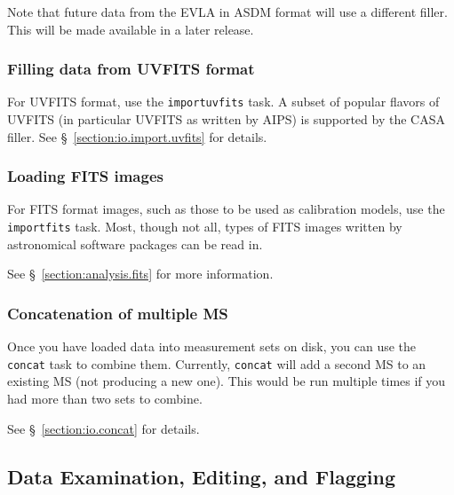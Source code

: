 
Note that future data from the EVLA in ASDM format will use a
different filler.  This will be made available in a later release.

\subsubsection{Filling data from UVFITS format}
\label{section:intro.walkthru.load.uvfits}

For UVFITS format, use the {\tt importuvfits} task. A subset of popular
flavors of UVFITS (in particular UVFITS as written by AIPS) is
supported by the CASA filler.  See \S~\ref{section:io.import.uvfits}
for details.

\subsubsection{Loading FITS images}
\label{section:intro.walkthru.load.imfits}

For FITS format images, such as those to be used as calibration
models, use the {\tt importfits} task.  Most, though not all, types
of FITS images written by astronomical software packages can be
read in.

See \S~\ref{section:analysis.fits} for more information.

\subsubsection{Concatenation of multiple MS}
\label{section:intro.walkthru.load.concat}

Once you have loaded data into measurement sets on disk, you 
can use the {\tt concat} task to combine them.  Currently,
{\tt concat} will add a second MS to an existing MS (not producing
a new one).  This would be run multiple times if you had more than
two sets to combine.

See \S~\ref{section:io.concat} for details.

\subsection{Data Examination, Editing, and Flagging} 
\label{section:intro.walkthru.flag}

